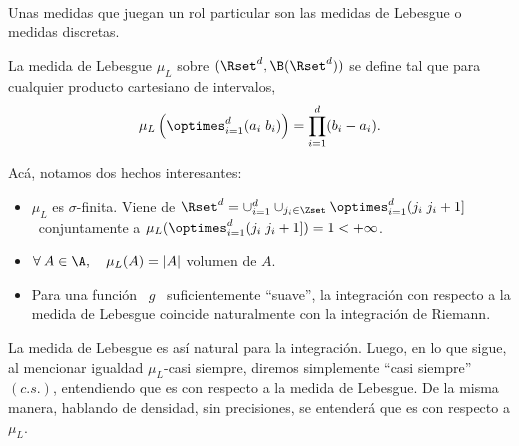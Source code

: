 \

Unas medidas que juegan un rol  particular son las medidas de Lebesgue o medidas
discretas.
%
\begin{definicion}
\label{Def:MP:Lebesgue}
%
  La medida de Lebesgue $\mu_L$  sobre $(\Rset^d,\B(\Rset^d))$ se define tal que
  para cualquier producto cartesiano de intervalos,
  \[
  \mu_L\left( \optimes_{i=1}^d (a_i \; b_i) \right) = \prod_{i=1}^d (b_i-a_i).
  \]
\end{definicion}
%
Ac\'a, notamos dos hechos interesantes:
%
\begin{itemize}
%
\item $\mu_L$ es $\sigma$-finita. Viene de $\Rset^d = \cup_{i=1}^d \cup_{j_i \in
    \Zset}   \optimes_{i=1}^d    (   j_i   \;   j_i+1]$    \   conjuntamente   a
  $\mu_L(\optimes_{i=1}^d ( j_i \; j_i+1]) = 1 < +\infty$.
%
\item $\forall \:  A \in \A, \quad  \mu_L(A) = |A|$ volumen de $A$.
%
\item Para una funci\'on \ $g$ \ suficientemente ``suave'', la integraci\'on con
  respecto a la medida de Lebesgue coincide naturalmente con la integraci\'on de
  Riemann.
\end{itemize}
%
La medida de Lebesgue es as\'i  natural para la integraci\'on.  Luego, en lo que
sigue, al  mencionar igualdad  $\mu_L$-casi siempre, diremos  simplemente ``casi
siempre'' $(c.s.)$, entendiendo que es con  respecto a la medida de Lebesgue. De
la misma  manera, hablando de densidad,  sin precisiones, se  entender\'a que es
con respecto a $\mu_L$.


